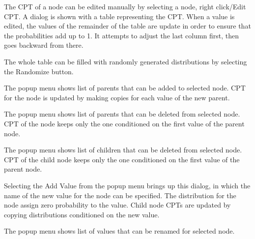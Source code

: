 The CPT of a node can be edited manually by selecting a node,
right click/Edit CPT. A dialog is shown with a table representing the
CPT. When a value is edited, the values of the remainder of the table
are update in order to ensure that the probabilities add up to 1.
It attempts to adjust the last column first, then goes backward from there.
\begin{center}
\end{center}
The whole table can be filled with randomly generated distributions by
selecting the Randomize button.



The popup menu shows list of parents that can be added to selected node.
CPT for the node is updated by making copies for each value of the new parent.
\begin{center}
\end{center}

The popup menu shows list of parents that can be deleted from selected node.
CPT of the node keeps only the one conditioned on the first value of the
parent node.
\begin{center}
\end{center}

The popup menu shows list of children that can be deleted from selected node.
CPT of the child node keeps only the one conditioned on the first value 
of the parent node.
\begin{center}
\end{center}


Selecting the Add Value from the popup menu brings up this dialog,
in which the name of the new value for the node can be specified.
The distribution for the node assign zero probability to the value.
Child node CPTs are updated by copying distributions conditioned on
the new value.
\begin{center}
\end{center}

The popup menu shows list of values that can be renamed for selected node.
\begin{center}
\end{center}

